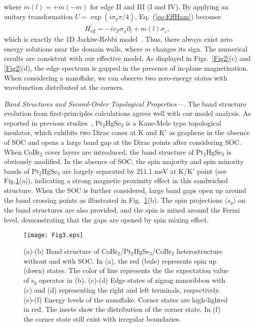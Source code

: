 \documentclass[aps,prl,twocolumn,showpacs,superscriptaddress]{revtex4-1}
\begin{document}
where $m(l)=+m (-m)$ for edge II and III (I and IV). By applying an unitary transformation $U=\exp(i\sigma_y{\pi}/{4})$, Eq.~(\ref{eq:EffHam}) becomes
\begin{eqnarray}\label{eq:EffHam_2}
H^\prime_{\text{eff}} =-iv_F\sigma_x\partial_l+m(l)\sigma_z,
\end{eqnarray}
which is exactly the 1D Jackiw-Rebbi model~\cite{Jackiw-Rebbi}. Thus, there always exist zero energy solutions near the domain walls, where $m$ changes its sign. The numerical results are consistent with our effective model. As displayed in Figs.~\ref{Fig2}(c) and \ref{Fig2}(d), the edge spectrum is gapped in the presence of in-plane magnetization. When considering a nanoflake, we can observe two zero-energy states with wavefunction distributed at the corners.

\textit{Band Structures and Second-Order Topological Properties---.}
The band structure evolution from first-principles calculations agrees well with our model analysis. As reported in previous studies~\cite{DFT_PHS1,DFT_PHS2}, Pt$_2$HgSe$_3$ is a Kane-Mele type topological insulator, which exhibits two Dirac cones at K and K$'$ as graphene in the absence of SOC and opens a large band gap at the Dirac points after considering SOC. When CoBr$_2$ cover layers are introduced, the band structure of Pt$_2$HgSe$_3$ is obviously modified. In the absence of SOC, the spin majority and spin minority bands of Pt$_2$HgSe$_3$ are largely separated by 211.1 meV at K/K$'$ point (see Fig.\ref{Fig3}(a)), indicating a strong magnetic proximity effect in this sandwiched structure. When the SOC is further considered, large band gaps open up around the band crossing points as illustrated in Fig.~\ref{Fig3}(b). The spin projections $\langle s_y \rangle$ on the band structures are also provided, and the spin is mixed around the Fermi level, demonstrating that the gaps are opened by spin mixing effect.

\begin{figure}
  \texttt{[image: Fig3.eps]}
  \caption{(a)-(b) Band structure of CoBr$_2$/Pt$_2$HgSe$_3$/CoBr$_2$ heterostructure without and with SOC. In (a), the red (bule) represents spin up (down) states. The color of line represents the the expectation value of s$_y$ operator in (b). (c)-(d) Edge states of zigzag nanoribbon with (c) and (d) representing the right and left terminals, respectively. (e)-(f) Energy levels of the nanoflake. Corner states are high-lighted in red. The insets show the distribution of the corner state. In (f) the corner state still exist with irregular boundaries.}
  \label{Fig3}
\end{figure}
\end{document}
